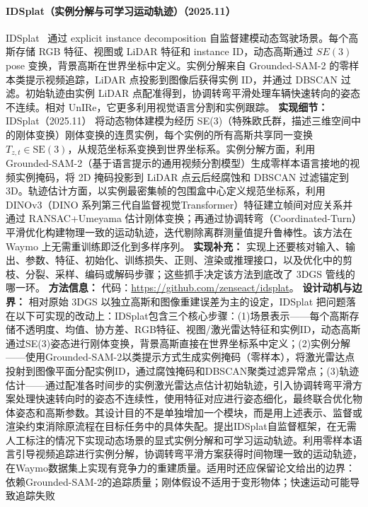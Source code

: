 \paragraph{IDSplat（实例分解与可学习运动轨迹）（2025.11）}
IDSplat~\cite{2511_19235} 通过 explicit instance decomposition 自监督建模动态驾驶场景。每个高斯存储 RGB 特征、视图或 LiDAR 特征和 instance ID，动态高斯通过 $SE(3)$ pose 变换，背景高斯在世界坐标中定义。实例分解来自 Grounded-SAM-2 的零样本类提示视频追踪，LiDAR 点投影到图像后获得实例 ID，并通过 DBSCAN 过滤。初始轨迹由实例 LiDAR 点配准得到，协调转弯平滑处理车辆快速转向的姿态不连续。相对 UnIRe，它更多利用视觉语言分割和实例跟踪。
\textbf{实现细节：} IDSplat（2025.11） 将动态物体建模为经历 SE(3)（特殊欧氏群，描述三维空间中的刚体变换）刚体变换的连贯实例，每个实例的所有高斯共享同一变换 $T_{z,t} \in \mathrm{SE}(3)$，从规范坐标系变换到世界坐标系。实例分解方面，利用 Grounded-SAM-2（基于语言提示的通用视频分割模型）生成零样本语言接地的视频实例掩码，将 2D 掩码投影到 LiDAR 点云后经腐蚀和 DBSCAN 过滤锚定到 3D。轨迹估计方面，以实例最密集帧的包围盒中心定义规范坐标系，利用 DINOv3（DINO 系列第三代自监督视觉Transformer）特征建立帧间对应关系并通过 RANSAC+Umeyama 估计刚体变换；再通过协调转弯（Coordinated-Turn）平滑优化构建物理一致的运动轨迹，迭代剔除离群测量值提升鲁棒性。该方法在 Waymo 上无需重训练即泛化到多样序列。
\textbf{实现补充：} 实现上还要核对输入、输出、参数、特征、初始化、训练损失、正则、渲染或推理接口，以及优化中的剪枝、分裂、采样、编码或解码步骤；这些抓手决定该方法到底改了 3DGS 管线的哪一环。
\textbf{方法信息：} 代码：\url{https://github.com/zenseact/idsplat}。
\textbf{设计动机与边界：} 相对原始 3DGS 以独立高斯和图像重建误差为主的设定，IDSplat 把问题落在以下可实现的改动上：IDSplat包含三个核心步骤：(1)场景表示——每个高斯存储不透明度、均值、协方差、RGB特征、视图/激光雷达特征和实例ID，动态高斯通过SE(3)姿态进行刚体变换，背景高斯直接在世界坐标系中定义；(2)实例分解——使用Grounded-SAM-2以类提示方式生成实例掩码（零样本），将激光雷达点投射到图像平面分配实例ID，通过腐蚀掩码和DBSCAN聚类过滤异常点；(3)轨迹估计——通过配准各时间步的实例激光雷达点估计初始轨迹，引入协调转弯平滑方案处理快速转向时的姿态不连续性，使用特征对应进行姿态细化，最终联合优化物体姿态和高斯参数。其设计目的不是单独增加一个模块，而是用上述表示、监督或渲染约束消除原流程在目标任务中的具体失配。提出IDSplat自监督框架，在无需人工标注的情况下实现动态场景的显式实例分解和可学习运动轨迹。利用零样本语言引导视频追踪进行实例分解，协调转弯平滑方案获得时间物理一致的运动轨迹，在Waymo数据集上实现有竞争力的重建质量。适用时还应保留论文给出的边界：依赖Grounded-SAM-2的追踪质量；刚体假设不适用于变形物体；快速运动可能导致追踪失败
